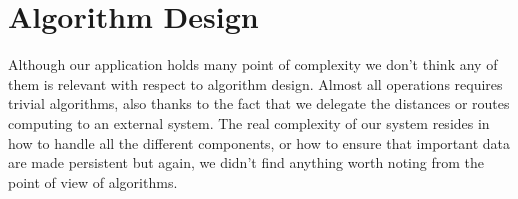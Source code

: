 \pagebreak
\section{Algorithm Design}
Although our application holds many point of complexity we don't think any of them
is relevant with respect to algorithm design. Almost all operations requires trivial
algorithms, also thanks to the fact that we delegate the distances or routes computing
to an external system. 
The real complexity of our system resides in how to handle all the different components, or
how to ensure that important data are made persistent but again, we didn't find anything worth
noting from the point of view of algorithms.
